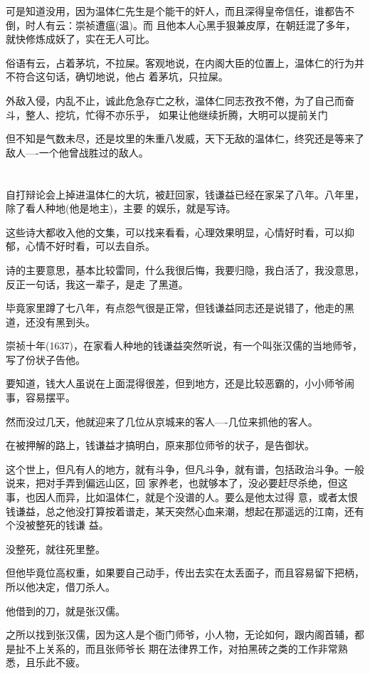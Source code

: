 \documentclass[11pt,a4paper,onecolumn]{article}
\begin{document}
可是知道没用，因为温体仁先生是个能干的奸人，而且深得皇帝信任，谁都告不倒，时人有云：崇祯遭瘟(温)。而
且他本人心黑手狠兼皮厚，在朝廷混了多年，就快修炼成妖了，实在无人可比。

俗语有云，占着茅坑，不拉屎。客观地说，在内阁大臣的位置上，温体仁的行为并不符合这句话，确切地说，他占
着茅坑，只拉屎。

外敌入侵，内乱不止，诚此危急存亡之秋，温体仁同志孜孜不倦，为了自己而奋斗，整人、挖坑，忙得不亦乐乎，
如果让他继续折腾，大明可以提前关门

但不知是气数未尽，还是坟里的朱重八发威，天下无敌的温体仁，终究还是等来了敌人----一个他曾战胜过的敌人。

\section[\thesection]{}

自打辩论会上掉进温体仁的大坑，被赶回家，钱谦益已经在家呆了八年。八年里，除了看人种地(他是地主)，主要
的娱乐，就是写诗。

这些诗大都收入他的文集，可以找来看看，心理效果明显，心情好时看，可以抑郁，心情不好时看，可以去自杀。

诗的主要意思，基本比较雷同，什么我很后悔，我要归隐，我白活了，我没意思，反正一句话，我这一辈子，是走
了黑道。

毕竟家里蹲了七八年，有点怨气很是正常，但钱谦益同志还是说错了，他走的黑道，还没有黑到头。

崇祯十年(1637)，在家看人种地的钱谦益突然听说，有一个叫张汉儒的当地师爷，写了份状子告他。

要知道，钱大人虽说在上面混得很差，但到地方，还是比较恶霸的，小小师爷闹事，容易摆平。

然而没过几天，他就迎来了几位从京城来的客人----几位来抓他的客人。

在被押解的路上，钱谦益才搞明白，原来那位师爷的状子，是告御状。

这个世上，但凡有人的地方，就有斗争，但凡斗争，就有谱，包括政治斗争。一般说来，把对手弄到偏远山区，回
家养老，也就够本了，没必要赶尽杀绝，但这事，也因人而异，比如温体仁，就是个没谱的人。要么是他太过得
意，或者太恨钱谦益，总之他没打算按着谱走，某天突然心血来潮，想起在那遥远的江南，还有个没被整死的钱谦
益。

没整死，就往死里整。

但他毕竟位高权重，如果要自己动手，传出去实在太丢面子，而且容易留下把柄，所以他决定，借刀杀人。

他借到的刀，就是张汉儒。

之所以找到张汉儒，因为这人是个衙门师爷，小人物，无论如何，跟内阁首辅，都是扯不上关系的，而且张师爷长
期在法律界工作，对拍黑砖之类的工作非常熟悉，且乐此不疲。
\end{document}
